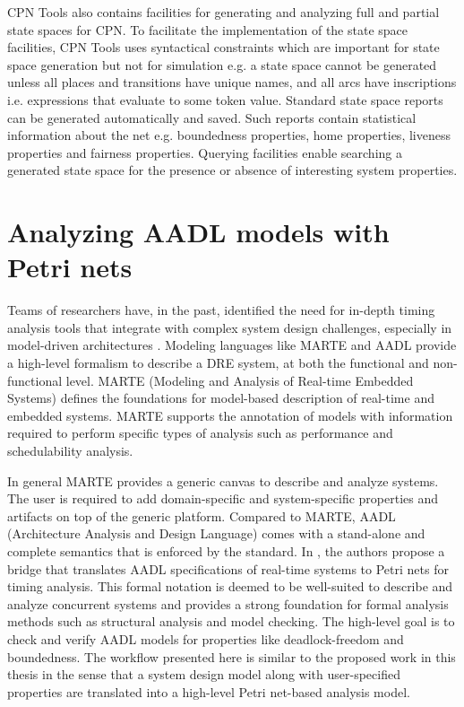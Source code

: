 CPN Tools also contains facilities for generating and analyzing full and partial state spaces for CPN. To facilitate the implementation of the state space facilities, CPN Tools uses syntactical constraints which are important for state space generation but not for simulation e.g. a state space cannot be generated unless all places and transitions have unique names, and all arcs have inscriptions i.e. expressions that evaluate to some token value. Standard state space reports can be generated automatically and saved. Such reports contain statistical information about the net e.g. boundedness properties, home properties, liveness properties and fairness properties. Querying facilities enable searching a generated state space for the presence or absence of interesting system properties. 

\section{Analyzing AADL models with Petri nets}

Teams of researchers have, in the past, identified the need for in-depth timing analysis tools that integrate with complex system design challenges, especially in model-driven architectures \cite{kordon_sn}. Modeling languages like MARTE \cite{MARTE:05} and AADL \cite{AADL_Intro:06} provide a high-level formalism to describe a DRE system, at both the functional and non-functional level. MARTE (Modeling and Analysis of Real-time Embedded Systems) defines the foundations for model-based description of real-time and embedded systems. MARTE supports the annotation of models with information required to perform specific types of analysis such as performance and schedulability analysis.

In general MARTE provides a generic canvas to describe and analyze systems. The user is required to add domain-specific and system-specific properties and artifacts on top of the generic platform. Compared to MARTE, AADL (Architecture Analysis and Design Language) comes with a stand-alone and complete semantics that is enforced by the standard. In \cite{kordon_sn}, the authors propose a bridge that translates AADL specifications of real-time systems to Petri nets for timing analysis. This formal notation is deemed to be well-suited to describe and analyze concurrent systems and provides a strong foundation for formal analysis \cite{girault2013petri} methods such as structural analysis and model checking. The high-level goal is to check and verify AADL models for properties like deadlock-freedom and boundedness. The workflow presented here is similar to the proposed work in this thesis in the sense that a system design model along with user-specified properties are translated into a high-level Petri net-based analysis model. 

